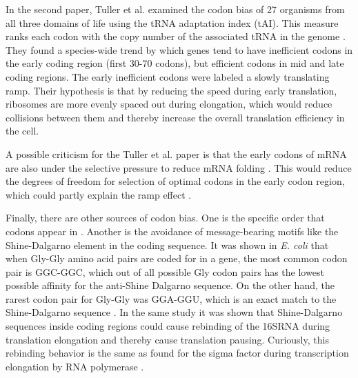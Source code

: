 In the second paper, Tuller et al. \cite{tuller_evolutionarily_2010} examined
the codon bias of 27 organisms from all three domains of life using the tRNA
adaptation index (tAI). This measure ranks each codon with the copy number of
the associated tRNA in the genome \cite{tuller_evolutionarily_2010}. They found
a species-wide trend by which genes tend to have inefficient codons in the early
coding region (first 30-70 codons), but efficient codons in mid and late coding
regions. The early inefficient codons were labeled a slowly translating ramp.
Their hypothesis is that by reducing the speed during early translation,
ribosomes are more evenly spaced out during elongation, which would reduce
collisions between them and thereby increase the overall translation efficiency
in the cell.

A possible criticism for the Tuller et al. paper is that the
early codons of mRNA are also under the selective pressure to reduce mRNA
folding \cite{gu_universal_2010}. This would reduce the degrees of freedom for
selection of optimal codons in the early codon region, which could partly
explain the ramp effect \cite{plotkin_synonymous_2011}.

Finally, there are other sources of codon bias. One is the specific order that
codons appear in \cite{cannarozzi_role_2010}. Another is the avoidance of
message-bearing motifs like the Shine-Dalgarno element in the coding sequence.
It was shown in \textit{E. coli} that when Gly-Gly amino acid pairs are coded
for in a gene, the most common codon pair is GGC-GGC, which out of all possible
Gly codon pairs has the lowest possible affinity for the anti-Shine Dalgarno
sequence. On the other hand, the rarest codon pair for Gly-Gly was GGA-GGU,
which is an exact match to the Shine-Dalgarno sequence
\cite{li_anti-shine-dalgarno_2012}. In the same study it was shown that
Shine-Dalgarno sequences inside coding regions could cause rebinding of the
16SRNA during translation elongation and thereby cause translation pausing.
Curiously, this rebinding behavior is the same as found for the sigma factor
during transcription elongation by RNA polymerase \cite{mooney_sigma_2005}.
